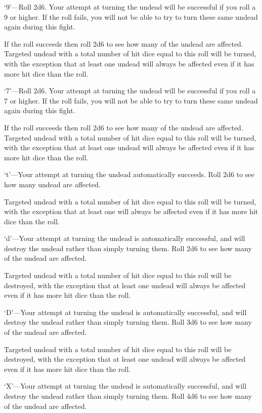 \begin{multicols*}{2}
‘9’—Roll 2d6. Your attempt at turning the undead will be successful if you roll a 9 or higher. If the roll fails, you will not be able to try to turn these same undead again during this fight.

If the roll succeeds then roll 2d6 to see how many of the undead are affected. Targeted undead with a total number of hit dice equal to this roll will be turned, with the exception that at least one undead will always be affected even if it has more hit dice than the roll.

‘7’—Roll 2d6. Your attempt at turning the undead will be successful if you roll a 7 or higher. If the roll fails, you will not be able to try to turn these same undead again during this fight.

If the roll succeeds then roll 2d6 to see how many of the undead are affected. Targeted undead with a total number of hit dice equal to this roll will be turned, with the exception that at least one undead will always be affected even if it has more hit dice than the roll.

‘t’—Your attempt at turning the undead automatically succeeds. Roll 2d6 to see how many undead are affected.

Targeted undead with a total number of hit dice equal to this roll will be turned, with the exception that at least one will always be affected even if it has more hit dice than the roll.

‘d’—Your attempt at turning the undead is automatically successful, and will destroy the undead rather than simply turning them. Roll 2d6 to see how many of the undead are affected.

Targeted undead with a total number of hit dice equal to this roll will be destroyed, with the exception that at least one undead will always be affected even if it has more hit dice than the roll.

‘D’—Your attempt at turning the undead is automatically successful, and will destroy the undead rather than simply turning them. Roll 3d6 to see how many of the undead are affected.

Targeted undead with a total number of hit dice equal to this roll will be destroyed, with the exception that at least one undead will always be affected even if it has more hit dice than the roll.

‘X’—Your attempt at turning the undead is automatically successful, and will destroy the undead rather than simply turning them. Roll 4d6 to see how many of the undead are affected.


\end{multicols*}
